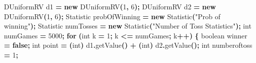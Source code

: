 \documentclass[
]{book}
\newenvironment{Shaded}{\begin{snugshade}}{\end{snugshade}}
\newcommand{\ControlFlowTok}[1]{\textcolor[rgb]{0.13,0.29,0.53}{\textbf{#1}}}
\newcommand{\DataTypeTok}[1]{\textcolor[rgb]{0.13,0.29,0.53}{#1}}
\newcommand{\DecValTok}[1]{\textcolor[rgb]{0.00,0.00,0.81}{#1}}
\newcommand{\FunctionTok}[1]{\textcolor[rgb]{0.00,0.00,0.00}{#1}}
\newcommand{\KeywordTok}[1]{\textcolor[rgb]{0.13,0.29,0.53}{\textbf{#1}}}
\newcommand{\NormalTok}[1]{#1}
\newcommand{\OperatorTok}[1]{\textcolor[rgb]{0.81,0.36,0.00}{\textbf{#1}}}
\newcommand{\StringTok}[1]{\textcolor[rgb]{0.31,0.60,0.02}{#1}}
\theoremstyle{definition}
\theoremstyle{definition}
\theoremstyle{definition}
\theoremstyle{definition}
\theoremstyle{remark}
\begin{document}
\begin{Shaded}
\begin{Highlighting}[]
\NormalTok{DUniformRV d1 }\OperatorTok{=} \KeywordTok{new} \FunctionTok{DUniformRV}\OperatorTok{(}\DecValTok{1}\OperatorTok{,} \DecValTok{6}\OperatorTok{);}
\NormalTok{DUniformRV d2 }\OperatorTok{=} \KeywordTok{new} \FunctionTok{DUniformRV}\OperatorTok{(}\DecValTok{1}\OperatorTok{,} \DecValTok{6}\OperatorTok{);}
\NormalTok{Statistic probOfWinning }\OperatorTok{=} \KeywordTok{new} \FunctionTok{Statistic}\OperatorTok{(}\StringTok{"Prob of winning"}\OperatorTok{);}
\NormalTok{Statistic numTosses }\OperatorTok{=} \KeywordTok{new} \FunctionTok{Statistic}\OperatorTok{(}\StringTok{"Number of Toss Statistics"}\OperatorTok{);}
\DataTypeTok{int}\NormalTok{ numGames }\OperatorTok{=} \DecValTok{5000}\OperatorTok{;}
\ControlFlowTok{for} \OperatorTok{(}\DataTypeTok{int}\NormalTok{ k }\OperatorTok{=} \DecValTok{1}\OperatorTok{;}\NormalTok{ k }\OperatorTok{\textless{}=}\NormalTok{ numGames}\OperatorTok{;}\NormalTok{ k}\OperatorTok{++)} \OperatorTok{\{}
    \DataTypeTok{boolean}\NormalTok{ winner }\OperatorTok{=} \KeywordTok{false}\OperatorTok{;}
    \DataTypeTok{int}\NormalTok{ point }\OperatorTok{=} \OperatorTok{(}\DataTypeTok{int}\OperatorTok{)}\NormalTok{ d1}\OperatorTok{.}\FunctionTok{getValue}\OperatorTok{()} \OperatorTok{+} \OperatorTok{(}\DataTypeTok{int}\OperatorTok{)}\NormalTok{ d2}\OperatorTok{.}\FunctionTok{getValue}\OperatorTok{();}
    \DataTypeTok{int}\NormalTok{ numberoftoss }\OperatorTok{=} \DecValTok{1}\OperatorTok{;}


\end{Highlighting}
\end{Shaded}
\end{document}
